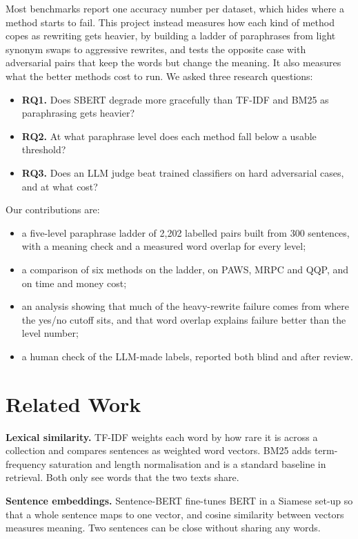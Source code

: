 \documentclass[11pt]{article}
\begin{document}
Most benchmarks report one accuracy number per dataset, which hides where a method starts to fail. This project instead measures how each kind of method copes as rewriting gets heavier, by building a ladder of paraphrases from light synonym swaps to aggressive rewrites, and tests the opposite case with adversarial pairs that keep the words but change the meaning. It also measures what the better methods cost to run. We asked three research questions:
\begin{itemize}\setlength{\itemsep}{1pt}\setlength{\parskip}{0pt}
\item \textbf{RQ1.} Does SBERT degrade more gracefully than TF-IDF and BM25 as paraphrasing gets heavier?
\item \textbf{RQ2.} At what paraphrase level does each method fall below a usable threshold?
\item \textbf{RQ3.} Does an LLM judge beat trained classifiers on hard adversarial cases, and at what cost?
\end{itemize}
Our contributions are:
\begin{itemize}\setlength{\itemsep}{1pt}\setlength{\parskip}{0pt}
\item a five-level paraphrase ladder of 2,202 labelled pairs built from 300 sentences, with a meaning check and a measured word overlap for every level;
\item a comparison of six methods on the ladder, on PAWS, MRPC and QQP, and on time and money cost;
\item an analysis showing that much of the heavy-rewrite failure comes from where the yes/no cutoff sits, and that word overlap explains failure better than the level number;
\item a human check of the LLM-made labels, reported both blind and after review.
\end{itemize}

\section{Related Work}
\textbf{Lexical similarity.} TF-IDF \citep{salton1988} weights each word by how rare it is across a collection and compares sentences as weighted word vectors. BM25 \citep{robertson2009} adds term-frequency saturation and length normalisation and is a standard baseline in retrieval. Both only see words that the two texts share.

\textbf{Sentence embeddings.} Sentence-BERT \citep{reimers2019} fine-tunes BERT in a Siamese set-up so that a whole sentence maps to one vector, and cosine similarity between vectors measures meaning. Two sentences can be close without sharing any words.
\end{document}
